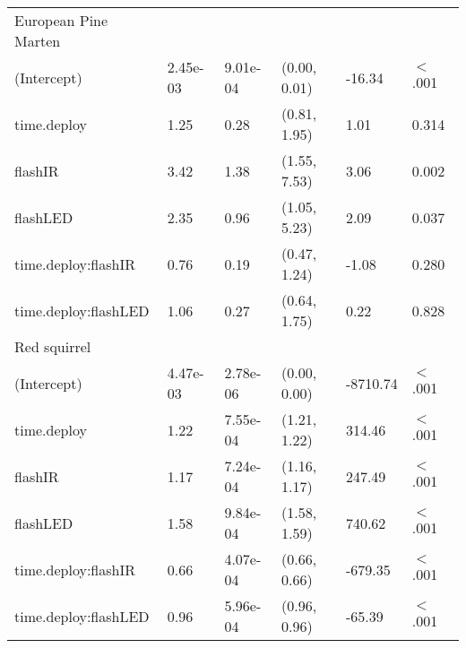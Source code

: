 \begin{table}[ht]
\begin{tabular}{llllll}
  European Pine Marten &  &  &  &  &        \\ 
  (Intercept) & 2.45e-03 & 9.01e-04 & (0.00, 0.01) & -16.34 & $<$ .001 \\ 
  time.deploy & 1.25 & 0.28 & (0.81, 1.95) & 1.01 & 0.314  \\ 
  flashIR & 3.42 & 1.38 & (1.55, 7.53) & 3.06 & 0.002  \\ 
  flashLED & 2.35 & 0.96 & (1.05, 5.23) & 2.09 & 0.037  \\ 
  time.deploy:flashIR & 0.76 & 0.19 & (0.47, 1.24) & -1.08 & 0.280  \\ 
  time.deploy:flashLED & 1.06 & 0.27 & (0.64, 1.75) & 0.22 & 0.828  \\ 
  Red squirrel &  &  &  &  &        \\ 
  (Intercept) & 4.47e-03 & 2.78e-06 & (0.00, 0.00) & -8710.74 & $<$ .001 \\ 
  time.deploy & 1.22 & 7.55e-04 & (1.21, 1.22) & 314.46 & $<$ .001 \\ 
  flashIR & 1.17 & 7.24e-04 & (1.16, 1.17) & 247.49 & $<$ .001 \\ 
  flashLED & 1.58 & 9.84e-04 & (1.58, 1.59) & 740.62 & $<$ .001 \\ 
  time.deploy:flashIR & 0.66 & 4.07e-04 & (0.66, 0.66) & -679.35 & $<$ .001 \\ 
  time.deploy:flashLED & 0.96 & 5.96e-04 & (0.96, 0.96) & -65.39 & $<$ .001 \\ 
   \hline
\end{tabular}
\end{table}
